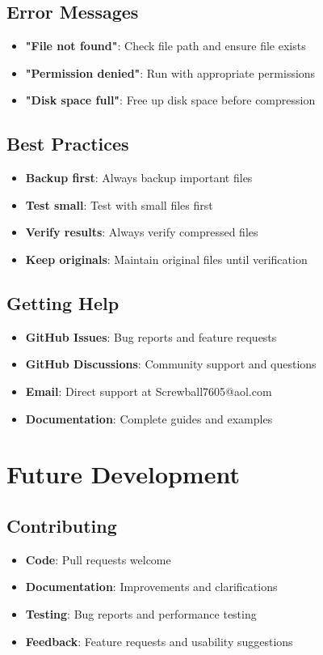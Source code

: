 \documentclass[12pt,a4paper]{article}
\makeatletter
\newcommand{\email}{Screwball7605@aol.com}
\makeatother
\begin{document}
\subsection{Error Messages}
\begin{itemize}
    \item \textbf{"File not found"}: Check file path and ensure file exists
    \item \textbf{"Permission denied"}: Run with appropriate permissions
    \item \textbf{"Disk space full"}: Free up disk space before compression
\end{itemize}

\subsection{Best Practices}
\begin{itemize}
    \item \textbf{Backup first}: Always backup important files
    \item \textbf{Test small}: Test with small files first
    \item \textbf{Verify results}: Always verify compressed files
    \item \textbf{Keep originals}: Maintain original files until verification
\end{itemize}

\subsection{Getting Help}
\begin{itemize}
    \item \textbf{GitHub Issues}: Bug reports and feature requests
    \item \textbf{GitHub Discussions}: Community support and questions
    \item \textbf{Email}: Direct support at \email
    \item \textbf{Documentation}: Complete guides and examples
\end{itemize}

\newpage

\section{Future Development}

\subsection{Contributing}
\begin{itemize}
    \item \textbf{Code}: Pull requests welcome
    \item \textbf{Documentation}: Improvements and clarifications
    \item \textbf{Testing}: Bug reports and performance testing
    \item \textbf{Feedback}: Feature requests and usability suggestions
\end{itemize}
\end{document}
